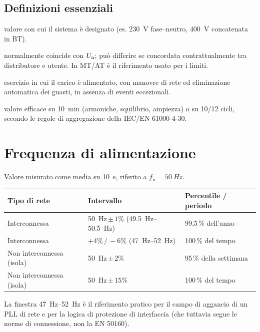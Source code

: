 \subsection*{Definizioni essenziali}

\begin{description}[style=nextline,leftmargin=0pt,itemsep=2pt]
  \item[Tensione nominale $\Un$] valore con cui il sistema è designato
        (es. \SI{230}{V} fase--neutro, \SI{400}{V} concatenata in BT).
  \item[Tensione dichiarata $\Uc$] normalmente coincide con $\Un$; può differire se
        concordata contrattualmente tra distributore e utente. In MT/AT è il
        riferimento usato per i limiti.
  \item[Condizioni normali di esercizio] esercizio in cui il carico è alimentato,
        con manovre di rete ed eliminazione automatica dei guasti, in assenza di
        eventi eccezionali.
  \item[Valore aggregato] valore efficace su \SI{10}{\minute} (armoniche, squilibrio,
        ampiezza) o su 10/12 cicli, secondo le regole di aggregazione della
        IEC/EN 61000-4-30.
\end{description}

\section{Frequenza di alimentazione}

Valore misurato come media su \SI{10}{\second}, riferito a $f_\mathrm{n}=\SI{50}{Hz}$.

\begin{table}[h]
\centering
\begin{tabular}{lll}
\toprule
\textbf{Tipo di rete} & \textbf{Intervallo} & \textbf{Percentile / periodo} \\
\midrule
Interconnessa & \SI{50}{Hz}\,$\pm\,1\%$ (\SIrange{49.5}{50.5}{Hz}) & 99,5\,\% dell'anno \\
Interconnessa & $+4\%\,/\,-6\%$ (\SIrange{47}{52}{Hz}) & 100\,\% del tempo \\
Non interconnessa (isola) & \SI{50}{Hz}\,$\pm\,2\%$ & 95\,\% della settimana \\
Non interconnessa (isola) & \SI{50}{Hz}\,$\pm\,15\%$ & 100\,\% del tempo \\
\bottomrule
\end{tabular}
\end{table}

\noindent
La finestra \SIrange{47}{52}{Hz} è il riferimento pratico per il campo di aggancio
di un PLL di rete e per la logica di protezione di interfaccia (che tuttavia segue
le norme di connessione, non la EN 50160).

